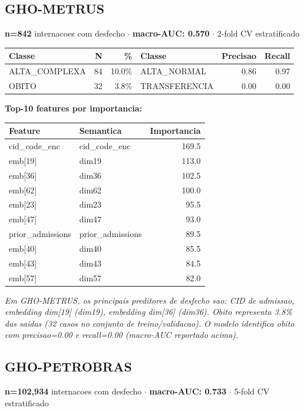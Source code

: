 \documentclass[11pt,a4paper]{article}
\begin{document}
\subsection{GHO-METRUS}
\textbf{n=842} internacoes com desfecho $\cdot$ \textbf{macro-AUC: 0.570} $\cdot$ 2-fold CV estratificado

\begin{tabular}{lrr|lrr}
\toprule
Classe & N & \% & Classe & Precisao & Recall \\
\midrule
ALTA\_COMPLEXA & 84 & 10.0\% & ALTA\_NORMAL & 0.86 & 0.97 \\
OBITO & 32 & 3.8\% & TRANSFERENCIA & 0.00 & 0.00 \\
\bottomrule
\end{tabular}

\vspace{4pt}\noindent\textbf{Top-10 features por importancia:}

\begin{tabular}{llr}
\toprule
Feature & Semantica & Importancia \\
\midrule
cid\_code\_enc & cid\_code\_enc & 169.5 \\
emb[19] & dim19 & 113.0 \\
emb[36] & dim36 & 102.5 \\
emb[62] & dim62 & 100.0 \\
emb[23] & dim23 & 95.5 \\
emb[47] & dim47 & 93.0 \\
prior\_admissions & prior\_admissions & 89.5 \\
emb[40] & dim40 & 85.5 \\
emb[43] & dim43 & 84.5 \\
emb[57] & dim57 & 82.0 \\
\bottomrule
\end{tabular}

\vspace{4pt}\noindent\textit{Em GHO-METRUS, os principais preditores de desfecho sao: CID de admissao, embedding dim[19] (dim19), embedding dim[36] (dim36). Obito representa 3.8\% das saidas (32 casos no conjunto de treino/validacao). O modelo identifica obito com precisao=0.00 e recall=0.00 (macro-AUC reportado acima).}

\subsection{GHO-PETROBRAS}
\textbf{n=102,934} internacoes com desfecho $\cdot$ \textbf{macro-AUC: 0.733} $\cdot$ 5-fold CV estratificado
\end{document}
